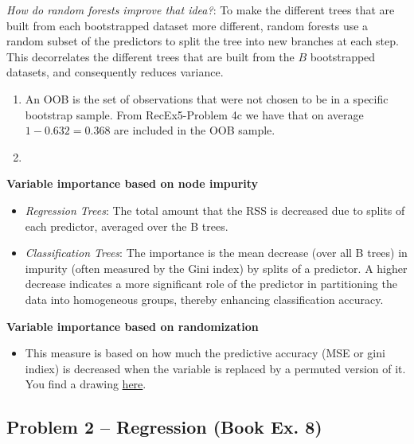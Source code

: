 \documentclass[
]{article}
\providecommand{\tightlist}{%
  \setlength{\itemsep}{0pt}\setlength{\parskip}{0pt}}
\begin{document}
\emph{How do random forests improve that idea?}: To make the different
trees that are built from each bootstrapped dataset more different,
random forests use a random subset of the predictors to split the tree
into new branches at each step. This decorrelates the different trees
that are built from the \(B\) bootstrapped datasets, and consequently
reduces variance.

\begin{enumerate}
\def\labelenumi{\alph{enumi})}
\setcounter{enumi}{3}
\item
  An OOB is the set of observations that were not chosen to be in a
  specific bootstrap sample. From RecEx5-Problem 4c we have that on
  average \(1-0.632 = 0.368\) are included in the OOB sample.
\item
\end{enumerate}

\textbf{Variable importance based on node impurity}

\begin{itemize}
\tightlist
\item
  \emph{Regression Trees}: The total amount that the RSS is decreased
  due to splits of each predictor, averaged over the B trees.
\item
  \emph{Classification Trees}: The importance is the mean decrease (over
  all B trees) in impurity (often measured by the Gini index) by splits
  of a predictor. A higher decrease indicates a more significant role of
  the predictor in partitioning the data into homogeneous groups,
  thereby enhancing classification accuracy.
\end{itemize}

\textbf{Variable importance based on randomization}

\begin{itemize}
\tightlist
\item
  This measure is based on how much the predictive accuracy (MSE or gini
  indiex) is decreased when the variable is replaced by a permuted
  version of it. You find a drawing
  \href{https://github.com/stefaniemuff/statlearning/blob/master/8Trees/M8_variableImportanceRandomization.pdf}{here}.
\end{itemize}

\hypertarget{problem-2-regression-book-ex.-8}{%
\subsection{Problem 2 -- Regression (Book Ex.
8)}\label{problem-2-regression-book-ex.-8}}
\end{document}
